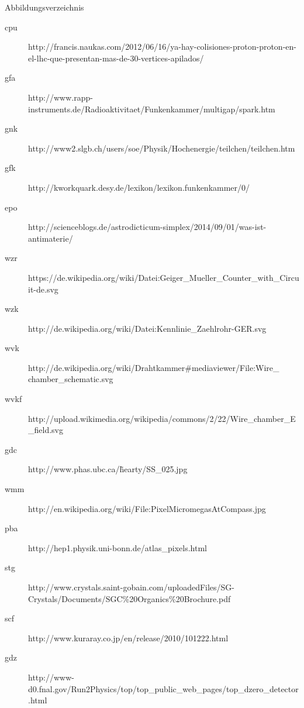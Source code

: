 \documentclass{beamer}
\begin{document}
\begin{frame}{Abbildungsverzeichnis}
\footnotesize
	\begin{adjustwidth}{-5em}{-2em}
	  	\begin{description}
	  		\item[cpu]
		  	http://francis.naukas.com/2012/06/16/ya-hay-colisiones-proton-proton-en-el-lhc-que-presentan-mas-de-30-vertices-apilados/
			\item[gfa]
		  	http://www.rapp-instruments.de/Radioaktivitaet/Funkenkammer/multigap/spark.htm	
		  	\item[gnk]
		  	http://www2.slgb.ch/users/soe/Physik/Hochenergie/teilchen/teilchen.htm  
		  	\item[gfk]
		  	http://kworkquark.desy.de/lexikon/lexikon.funkenkammer/0/
		  	\item[epo]
		  	http://scienceblogs.de/astrodicticum-simplex/2014/09/01/was-ist-antimaterie/
		 	\item[wzr]
		  	https://de.wikipedia.org/wiki/Datei:Geiger\_Mueller\_Counter\_with\_Circuit-de.svg
		  	\item[wzk]
			http://de.wikipedia.org/wiki/Datei:Kennlinie\_Zaehlrohr-GER.svg
			\item[wvk]
		  	http://de.wikipedia.org/wiki/Drahtkammer\#mediaviewer/File:Wire\_ chamber\_schematic.svg
		  	\item[wvkf]
		  	http://upload.wikimedia.org/wikipedia/commons/2/22/Wire\_chamber\_E\_field.svg
		  	\item[gdc]
		  	http://www.phas.ubc.ca/\~hearty/SS\_025.jpg
		  	\item[wmm]
		  	http://en.wikipedia.org/wiki/File:PixelMicromegasAtCompass.jpg
		  	\item[pba]
		  	http://hep1.physik.uni-bonn.de/atlas\_pixels.html
		  	\item[stg]
		  	http://www.crystals.saint-gobain.com/uploadedFiles/SG-Crystals/Documents/SGC\%20Organics\%20Brochure.pdf
		  	\item[scf]
		  	http://www.kuraray.co.jp/en/release/2010/101222.html
			\item[gdz]
		  	http://www-d0.fnal.gov/Run2Physics/top/top\_public\_web\_pages/top\_dzero\_detector.html
		  	
		\end{description}
	\end{adjustwidth}
\end{frame}
\end{document}
